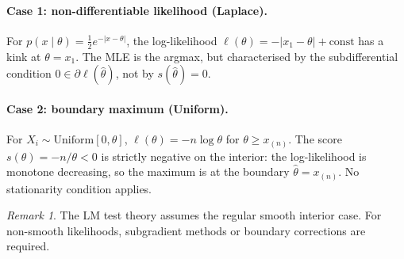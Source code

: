 \documentclass[a4paper,oneside,12pt]{extarticle}
\theoremstyle{plain}
\theoremstyle{definition}
\theoremstyle{remark}
\newtheorem{remark}[proposition]{Remark}
\begin{document}
\paragraph{Case 1: non-differentiable likelihood (Laplace).}
For $p(x\mid\theta)=\tfrac{1}{2}e^{-|x-\theta|}$, the log-likelihood
$\ell(\theta)=-|x_1-\theta|+\text{const}$ has a kink at $\theta=x_1$.
The MLE is the argmax, but characterised by the subdifferential
condition $0\in\partial\ell(\hat\theta)$, not by $s(\hat\theta)=0$.

\paragraph{Case 2: boundary maximum (Uniform).}
For $X_i\sim\mathrm{Uniform}[0,\theta]$, $\ell(\theta)=-n\log\theta$
for $\theta\geq x_{(n)}$.  The score $s(\theta)=-n/\theta<0$ is
strictly negative on the interior: the log-likelihood is monotone
decreasing, so the maximum is at the boundary $\hat\theta=x_{(n)}$.
No stationarity condition applies.

\begin{remark}
The LM test theory assumes the regular smooth interior case.
For non-smooth likelihoods, subgradient methods or boundary
corrections are required.
\end{remark}


\end{document}
